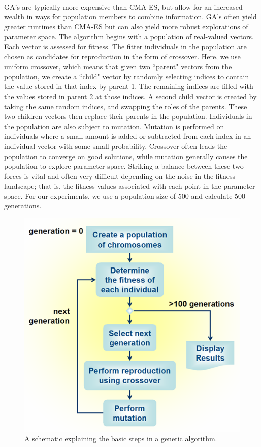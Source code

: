 \\
GA's are typically more expensive than CMA-ES, but allow for an increased wealth in ways for population members to combine information. GA's often yield greater runtimes than CMA-ES but can also yield more robust explorations of parameter space. The algorithm begins with a population of real-valued vectors. Each vector is assessed for fitness. The fitter individuals in the population are chosen as candidates for reproduction in the form of crossover. Here, we use uniform crossover, which means that given two ``parent" vectors from the population, we create a ``child" vector by randomly selecting indices to contain the value stored in that index by parent 1. The remaining indices are filled with the values stored in parent 2 at those indices. A second child vector is created by taking the same random indices, and swapping the roles of the parents. These two children vectors then replace their parents in the population. Individuals in the population are also subject to mutation. Mutation is performed on individuals where a small amount is added or subtracted from each index in an individual vector with some small probability. Crossover often leads the population to converge on good solutions, while mutation generally causes the population to explore parameter space. Striking a balance between these two forces is vital and often very difficult depending on the noise in the fitness landscape; that is, the fitness values associated with each point in the parameter space. For our experiments, we use a population size of 500 and calculate 500 generations.

\begin{figure}[tpb!]
\centering
  \includegraphics[width=.48\textwidth]{gaImg.png}
  \caption{
      A schematic explaining the basic steps in a genetic algorithm.
    }
  \label{fig:ga}
\end{figure}

